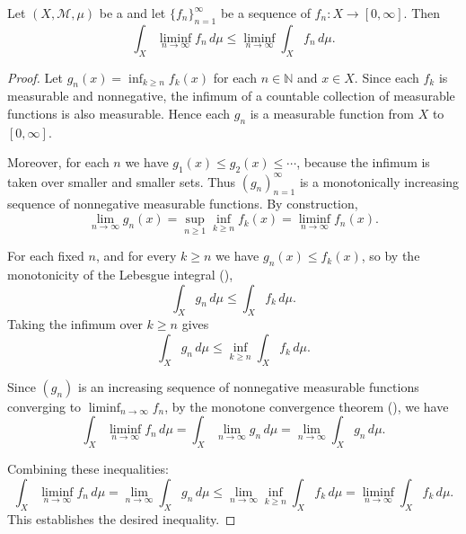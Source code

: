 \begin{lemma} \label{lemma:fatous_lemma}
    Let $(X, \mathcal{M}, \mu)$ be a  and let $\{f_n\}_{n=1}^{\infty}$ be a sequence of  $f_n : X \to [0, \infty]$. Then
    $$\int_X \liminf_{n \to \infty} f_n \, d\mu \leq \liminf_{n \to \infty} \int_X f_n \, d\mu.$$
\end{lemma}
\begin{proof}
    Let $g_n(x) = \inf_{k \geq n} f_k(x)$ for each $n \in \mathbb{N}$ and $x \in X$. Since each $f_k$ is measurable and nonnegative, the infimum of a countable collection of measurable functions is also measurable. Hence each $g_n$ is a measurable function from $X$ to $[0, \infty]$.

    Moreover, for each $n$ we have $g_1(x) \leq g_2(x) \leq \cdots$, because the infimum is taken over smaller and smaller sets. Thus $(g_n)_{n=1}^\infty$ is a monotonically increasing sequence of nonnegative measurable functions. By construction,
    $$\lim_{n \to \infty} g_n(x) = \sup_{n \geq 1} \inf_{k \geq n} f_k(x) = \liminf_{n \to \infty} f_n(x).$$

    For each fixed $n$, and for every $k \geq n$ we have $g_n(x) \leq f_k(x)$, so by the monotonicity of the Lebesgue integral (),
    $$\int_X g_n \, d\mu \leq \int_X f_k \, d\mu.$$
    Taking the infimum over $k \geq n$ gives
    $$\int_X g_n \, d\mu \leq \inf_{k \geq n} \int_X f_k \, d\mu.$$

    Since $(g_n)$ is an increasing sequence of nonnegative measurable functions converging to $\liminf_{n \to \infty} f_n$, by the monotone convergence theorem (), we have
    $$\int_X \liminf_{n \to \infty} f_n \, d\mu = \int_X \lim_{n \to \infty} g_n \, d\mu = \lim_{n \to \infty} \int_X g_n \, d\mu.$$

    Combining these inequalities:
    $$\int_X \liminf_{n \to \infty} f_n \, d\mu = \lim_{n \to \infty} \int_X g_n \, d\mu \leq \lim_{n \to \infty} \inf_{k \geq n} \int_X f_k \, d\mu = \liminf_{n \to \infty} \int_X f_k \, d\mu.$$
    This establishes the desired inequality.
\end{proof}
